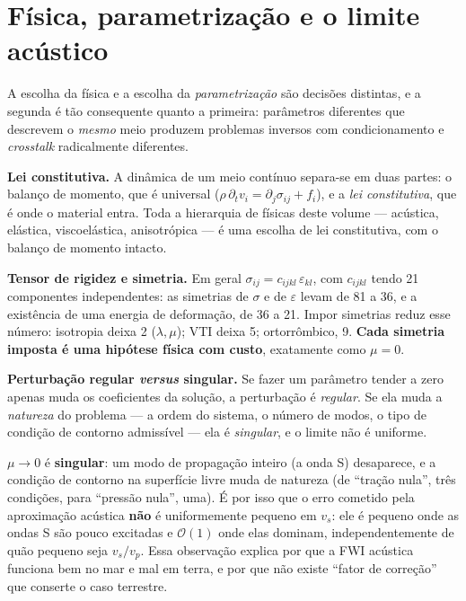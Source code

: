 \documentclass[11pt,a4paper,oneside]{report}
\begin{document}
\chapter{F\'isica, parametriza\c{c}\~ao e o limite ac\'ustico}
\label{cap:fisica}

\begin{ideia}
A escolha da f\'isica e a escolha da \emph{parametriza\c{c}\~ao} s\~ao
decis\~oes distintas, e a segunda \'e t\~ao consequente quanto a primeira:
par\^ametros diferentes que descrevem o \emph{mesmo} meio produzem problemas
inversos com condicionamento e \emph{crosstalk} radicalmente diferentes.
\end{ideia}

\begin{matematica}
\textbf{Lei constitutiva.} A din\^amica de um meio cont\'inuo separa-se em
duas partes: o balan\c{c}o de momento, que \'e universal
($\rho\,\partial_t v_i = \partial_j\sigma_{ij} + f_i$), e a
\emph{lei constitutiva}, que \'e onde o material entra. Toda a hierarquia de
f\'isicas deste volume --- ac\'ustica, el\'astica, viscoel\'astica,
anisotr\'opica --- \'e uma escolha de lei constitutiva, com o balan\c{c}o de
momento intacto.

\textbf{Tensor de rigidez e simetria.} Em geral
$\sigma_{ij} = c_{ijkl}\,\varepsilon_{kl}$, com $c_{ijkl}$ tendo 21
componentes independentes: as simetrias de $\sigma$ e de $\varepsilon$ levam
de 81 a 36, e a exist\^encia de uma energia de deforma\c{c}\~ao, de 36 a 21. Impor simetrias reduz esse n\'umero:
isotropia deixa 2 ($\lambda,\mu$); VTI deixa 5; ortorr\^ombico, 9. \textbf{Cada
simetria imposta \'e uma hip\'otese f\'isica com custo}, exatamente como
$\mu = 0$.

\textbf{Perturba\c{c}\~ao regular \emph{versus} singular.} Se fazer um
par\^ametro tender a zero apenas muda os coeficientes da solu\c{c}\~ao, a
perturba\c{c}\~ao \'e \emph{regular}. Se ela muda a \emph{natureza} do
problema --- a ordem do sistema, o n\'umero de modos, o tipo de
condi\c{c}\~ao de contorno admiss\'ivel --- ela \'e \emph{singular}, e o
limite n\~ao \'e uniforme.

$\mu\to 0$ \'e \textbf{singular}: um modo de propaga\c{c}\~ao inteiro (a onda
S) desaparece, e a condi\c{c}\~ao de contorno na superf\'icie livre muda de
natureza (de ``tra\c{c}\~ao nula'', tr\^es condi\c{c}\~oes, para ``press\~ao
nula'', uma). \'E por isso que o erro cometido pela aproxima\c{c}\~ao
ac\'ustica \textbf{n\~ao} \'e uniformemente pequeno em $v_s$: ele \'e pequeno
onde as ondas S s\~ao pouco excitadas e $\mathcal{O}(1)$ onde elas dominam,
independentemente de qu\~ao pequeno seja $v_s/v_p$. Essa observa\c{c}\~ao
explica por que a FWI ac\'ustica funciona bem no mar e mal em terra, e por que
n\~ao existe ``fator de corre\c{c}\~ao'' que conserte o caso terrestre.
\end{matematica}
\end{document}
